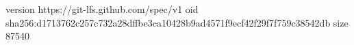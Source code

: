 version https://git-lfs.github.com/spec/v1
oid sha256:d1713762c257c732a28dffbe3ca10428b9ad4571f9ecf42f29f7f759c38542db
size 87540

